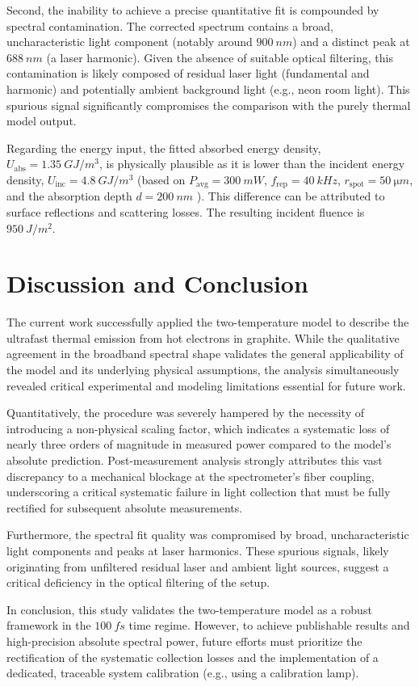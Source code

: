 \documentclass[
	a4paper,
]{scrarticle}
\begin{document}
Second, the inability to achieve a precise quantitative fit is compounded by spectral contamination. The corrected spectrum contains a broad, uncharacteristic light component (notably around $\SI{900}{nm}$) and a distinct peak at $\SI{688}{nm}$ (a laser harmonic). Given the absence of suitable optical filtering, this contamination is likely composed of residual laser light (fundamental and harmonic) and potentially ambient background light (e.g., neon room light). This spurious signal significantly compromises the comparison with the purely thermal model output.

Regarding the energy input, the fitted absorbed energy density, $U_{\text{abs}} = \SI{1.35}{GJ/m^3}$, is physically plausible as it is lower than the incident energy density, $U_{\text{inc}} = \SI{4.8}{GJ/m^3}$ (based on $P_{\text{avg}}=\SI{300}{mW}$, $f_{\text{rep}}=\SI{40}{kHz}$, $r_{\text{spot}}=\SI{50}{\micro m}$, and the absorption depth $d=\SI{200}{nm}$ \cite{smauszDeterminationUVVisible2017}). This difference can be attributed to surface reflections and scattering losses. The resulting incident fluence is $\SI{950}{J/m^2}$.


\section{Discussion and Conclusion}
The current work successfully applied the two-temperature model to describe the ultrafast thermal emission from hot electrons in graphite. While the qualitative agreement in the broadband spectral shape validates the general applicability of the model and its underlying physical assumptions, the analysis simultaneously revealed critical experimental and modeling limitations essential for future work. 

Quantitatively, the procedure was severely hampered by the necessity of introducing a non-physical scaling factor, which indicates a systematic loss of nearly three orders of magnitude in measured power compared to the model's absolute prediction. Post-measurement analysis strongly attributes this vast discrepancy to a mechanical blockage at the spectrometer's fiber coupling, underscoring a critical systematic failure in light collection that must be fully rectified for subsequent absolute measurements. 

Furthermore, the spectral fit quality was compromised by broad, uncharacteristic light components and peaks at laser harmonics. These spurious signals, likely originating from unfiltered residual laser and ambient light sources, suggest a critical deficiency in the optical filtering of the setup. 

In conclusion, this study validates the two-temperature model as a robust framework in the $\SI{100}{fs}$ time regime. However, to achieve publishable results and high-precision absolute spectral power, future efforts must prioritize the rectification of the systematic collection losses and the implementation of a dedicated, traceable system calibration (e.g., using a calibration lamp).

\clearpage
\printbibliography
\end{document}
